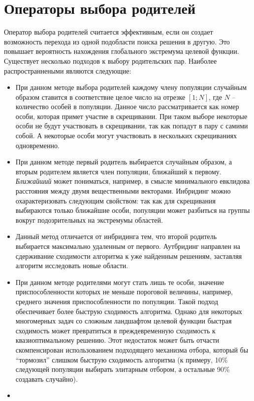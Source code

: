 \section{Операторы выбора родителей}
Оператор выбора родителей считается эффективным, если он создает возможность перехода из одной подобласти поиска решения в другую. Это повышает вероятность нахождения глобального экстремума целевой функции. Существует несколько подходов к выбору родительских пар. Наиболее распространнеными являются следующие:
\begin{itemize}[label=$\ast$]
	\item {}

При данном методе выбора родителей каждому члену популяции случайным образом ставится в соответствие целое число на отрезке $[1; N]$, где $N$ -- количество особей в популяции. Данное число рассматривается как номер особи, которая примет участие в скрещивании. При таком выборе некоторые особи не будут участвовать в скрещивании, так как попадут в пару с самими собой. А некоторые особи могут участвовать в нескольких скрещиваниях одновременно.
	\item {}

При данном методе первый родитель выбирается случайным образом, а вторым родителем является член популяции, ближайший к первому. \textit{Ближайший} может пониматься, например, в смысле минимального евклидова расстояния между двумя вещественными векторами.
Инбридинг можно охарактеризовать следующим свойством: так как для скрещивания выбираются только ближайшие особи, популяции может разбиться на группы вокруг подозрительных на экстремумы областей.
	\item {}

Данный метод отличается от инбридинга тем, что второй родитель выбирается максимально удаленным от первого.
Аутбридинг направлен на сдерживание сходимости алгоритма к уже найденным решениям, заставляя алгоритм исследовать новые области.
	\item {}

При данном методе родителями могут стать лишь те особи, значение приспособленности которых не меньше пороговой величины, например, среднего значения приспособленности по популяции. Такой подход обеспечивает более быструю сходимость алгоритма. Однако для некоторых многомерных задач со сложным ландшафтом целевой функции быстрая сходимость может превратиться в преждевременную сходимость к квазиоптимальному решению. Этот недостаток может быть отчасти скомпенсирован использованием подходящего механизма отбора, который бы ``тормозил'' слишком быструю сходимость алгоритма (к примеру, 10\% следующей популяции выбирать элитарным отбором, а остальные 90\% создавать случайно).
	\item {}


\end{itemize}
